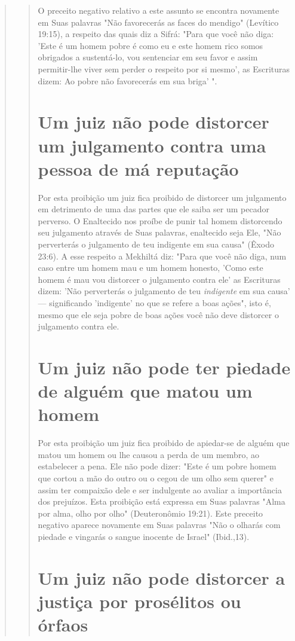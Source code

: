 \begin{quote}
\begin{quote}
O preceito negativo relativo a este assunto se encontra novamente em
Suas palavras "Não favorecerás as faces do mendigo" (Levítico 19:15), a
res­peito das quais diz a Sifrá: "Para que você não diga: 'Este é um
homem pobre é como eu e este homem rico somos obrigados a sustentá-lo,
vou sentenciar em seu favor e assim permitir-lhe viver sem perder o
respeito por si mesmo', as Escrituras dizem: Ao pobre não favorecerás em
sua briga' ".

\section{Um juiz não pode distorcer um julgamento contra uma pessoa de má reputação}

Por esta proibição um juiz fica proibido de distorcer um julgamento em
detrimento de uma das partes que ele saiba ser um pecador perverso. O
Enaltecido nos proíbe de punir tal homem distorcendo seu julgamento
através de Suas palavras, enaltecido seja Ele, "Não perverterás o
julgamento de teu in­digente em sua causa" (Êxodo 23:6). A esse respeito
a Mekhiltá diz: "Para que você não diga, num caso entre um homem mau e
um homem honesto, 'Como este homem é mau vou distorcer o julgamento
contra ele' as Escrituras dizem: 'Não perverterás o julgamento de teu
\emph{indigente} em sua causa' --- significando 'indigente' no que se
refere a boas ações", isto é, mesmo que ele seja pobre de boas ações
você não deve distorcer o julgamento contra ele.

\section{Um juiz não pode ter piedade de alguém que matou um homem}

Por esta proibição um juiz fica proibido de apiedar-se de alguém que
matou um homem ou lhe causou a perda de um membro, ao estabelecer a
pe­na. Ele não pode dizer: "Este é um pobre homem que cortou a mão do
outro ou o cegou de um olho sem querer" e assim ter compaixão dele e ser
indulgen­te ao avaliar a importância dos prejuízos. Esta proibição está
expressa em Suas palavras "Alma por alma, olho por olho" (Deuteronômio
19:21). Este preceito negativo aparece novamente em Suas palavras "Não o
olharás com piedade e vingarás o sangue inocente de Israel" (Ibid.,13).

\section{Um juiz não pode distorcer a justiça por prosélitos ou órfaos}


\end{quote}
\end{quote}
